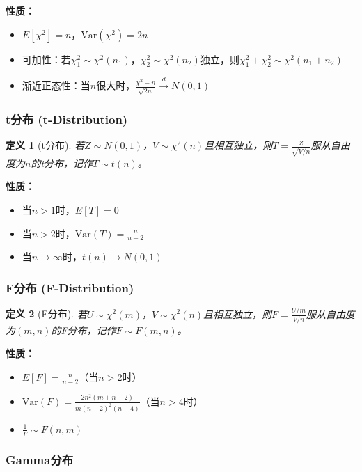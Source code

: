 \documentclass[12pt,a4paper]{article}
\newtheorem{definition}{定义}[section]
\theoremstyle{remark}
\begin{document}
\textbf{性质：}
\begin{itemize}
\item $E[\chi^2] = n$，$\text{Var}(\chi^2) = 2n$
\item 可加性：若$\chi_1^2 \sim \chi^2(n_1)$，$\chi_2^2 \sim \chi^2(n_2)$独立，则$\chi_1^2 + \chi_2^2 \sim \chi^2(n_1 + n_2)$
\item 渐近正态性：当$n$很大时，$\frac{\chi^2 - n}{\sqrt{2n}} \stackrel{d}{\to} N(0,1)$
\end{itemize}

\subsubsection{t分布 (t-Distribution)}

\begin{definition}[t分布]
若$Z \sim N(0,1)$，$V \sim \chi^2(n)$且相互独立，则$T = \frac{Z}{\sqrt{V/n}}$服从自由度为$n$的t分布，记作$T \sim t(n)$。
\end{definition}

\textbf{性质：}
\begin{itemize}
\item 当$n > 1$时，$E[T] = 0$
\item 当$n > 2$时，$\text{Var}(T) = \frac{n}{n-2}$
\item 当$n \to \infty$时，$t(n) \to N(0,1)$
\end{itemize}

\subsubsection{F分布 (F-Distribution)}

\begin{definition}[F分布]
若$U \sim \chi^2(m)$，$V \sim \chi^2(n)$且相互独立，则$F = \frac{U/m}{V/n}$服从自由度为$(m,n)$的F分布，记作$F \sim F(m,n)$。
\end{definition}

\textbf{性质：}
\begin{itemize}
\item $E[F] = \frac{n}{n-2}$（当$n > 2$时）
\item $\text{Var}(F) = \frac{2n^2(m+n-2)}{m(n-2)^2(n-4)}$（当$n > 4$时）
\item $\frac{1}{F} \sim F(n,m)$
\end{itemize}

\subsubsection{Gamma分布}
\end{document}

